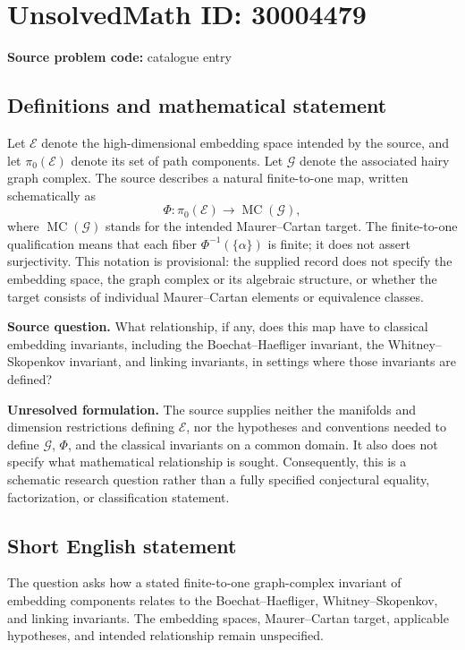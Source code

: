 \documentclass[11pt]{article}
\begin{document}
\section*{UnsolvedMath ID: 30004479}
\textbf{Source problem code:} catalogue entry
\subsection{Definitions and mathematical statement}
Let \(\mathcal E\) denote the high-dimensional embedding space intended by the source, and let \(\pi_0(\mathcal E)\) denote its set of path components. Let \(\mathcal G\) denote the associated hairy graph complex. The source describes a natural finite-to-one map, written schematically as
\[
\Phi\colon \pi_0(\mathcal E)\longrightarrow \operatorname{MC}(\mathcal G),
\]
where \(\operatorname{MC}(\mathcal G)\) stands for the intended Maurer--Cartan target. The finite-to-one qualification means that each fiber \(\Phi^{-1}(\{\alpha\})\) is finite; it does not assert surjectivity. This notation is provisional: the supplied record does not specify the embedding space, the graph complex or its algebraic structure, or whether the target consists of individual Maurer--Cartan elements or equivalence classes.

\textbf{Source question.} What relationship, if any, does this map have to classical embedding invariants, including the Boechat--Haefliger invariant, the Whitney--Skopenkov invariant, and linking invariants, in settings where those invariants are defined?

\textbf{Unresolved formulation.} The source supplies neither the manifolds and dimension restrictions defining \(\mathcal E\), nor the hypotheses and conventions needed to define \(\mathcal G\), \(\Phi\), and the classical invariants on a common domain. It also does not specify what mathematical relationship is sought. Consequently, this is a schematic research question rather than a fully specified conjectural equality, factorization, or classification statement.
\subsection{Short English statement}
The question asks how a stated finite-to-one graph-complex invariant of embedding components relates to the Boechat--Haefliger, Whitney--Skopenkov, and linking invariants. The embedding spaces, Maurer--Cartan target, applicable hypotheses, and intended relationship remain unspecified.
\end{document}
